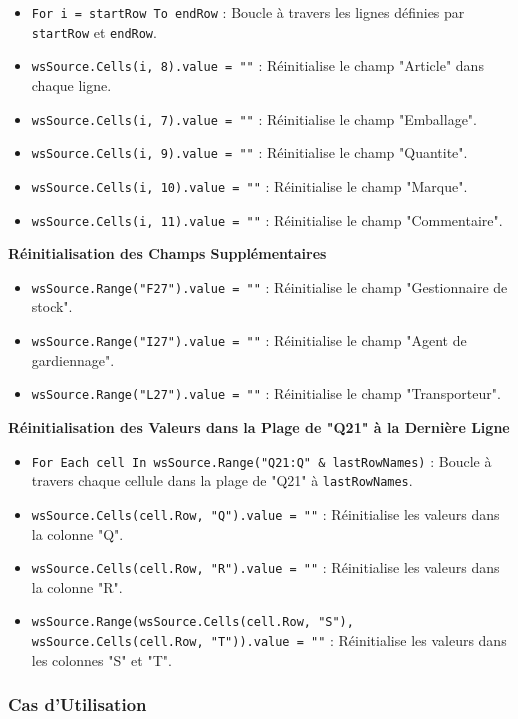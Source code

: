 \documentclass[a4paper, oneside, 12pt, final]{extreport}
\begin{document}
\begin{itemize}
    \item \texttt{For i = startRow To endRow} : Boucle à travers les lignes définies par \texttt{startRow} et \texttt{endRow}.
    \item \texttt{wsSource.Cells(i, 8).value = ""} : Réinitialise le champ "Article" dans chaque ligne.
    \item \texttt{wsSource.Cells(i, 7).value = ""} : Réinitialise le champ "Emballage".
    \item \texttt{wsSource.Cells(i, 9).value = ""} : Réinitialise le champ "Quantite".
    \item \texttt{wsSource.Cells(i, 10).value = ""} : Réinitialise le champ "Marque".
    \item \texttt{wsSource.Cells(i, 11).value = ""} : Réinitialise le champ "Commentaire".
\end{itemize}

\textbf{Réinitialisation des Champs Supplémentaires}

\begin{itemize}
    \item \texttt{wsSource.Range("F27").value = ""} : Réinitialise le champ "Gestionnaire de stock".
    \item \texttt{wsSource.Range("I27").value = ""} : Réinitialise le champ "Agent de gardiennage".
    \item \texttt{wsSource.Range("L27").value = ""} : Réinitialise le champ "Transporteur".
\end{itemize}
\textbf{Réinitialisation des Valeurs dans la Plage de "Q21" à la Dernière Ligne}

\begin{itemize}
    \item \texttt{For Each cell In wsSource.Range("Q21:Q" \& lastRowNames)} : Boucle à travers chaque cellule dans la plage de "Q21" à \texttt{lastRowNames}.
    \item \texttt{wsSource.Cells(cell.Row, "Q").value = ""} : Réinitialise les valeurs dans la colonne "Q".
    \item \texttt{wsSource.Cells(cell.Row, "R").value = ""} : Réinitialise les valeurs dans la colonne "R".
    \item \texttt{wsSource.Range(wsSource.Cells(cell.Row, "S"), wsSource.Cells(cell.Row, "T")).value = ""} : Réinitialise les valeurs dans les colonnes "S" et "T".
\end{itemize}

\subsubsection{Cas d'Utilisation}
\end{document}
